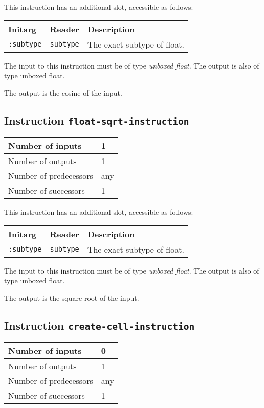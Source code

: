 This instruction has an additional slot, accessible as follows:

\begin{tabular}{|l|l|l|}
  \hline
  Initarg & Reader & Description\\
  \hline\hline
  \texttt{:subtype} & \texttt{subtype} & The exact subtype of float.\\
  \hline
\end{tabular}

The input to this instruction must be of type \emph{unboxed
  float}. The output is also of type unboxed float.

The output is the cosine of the input.

\subsection{Instruction \texttt{float-sqrt-instruction}}
\label{hir-instruction-float-div}

\begin{tabular}{|l|l|}
\hline
Number of inputs & 1\\
\hline
Number of outputs & 1\\
\hline
Number of predecessors & any\\
\hline
Number of successors & 1\\
\hline
\end{tabular}

This instruction has an additional slot, accessible as follows:

\begin{tabular}{|l|l|l|}
  \hline
  Initarg & Reader & Description\\
  \hline\hline
  \texttt{:subtype} & \texttt{subtype} & The exact subtype of float.\\
  \hline
\end{tabular}

The input to this instruction must be of type \emph{unboxed
  float}. The output is also of type unboxed float.

The output is the square root of the input.

\subsection{Instruction \texttt{create-cell-instruction}}
\label{hir-instruction-create-cell}

\begin{tabular}{|l|l|}
\hline
Number of inputs & 0\\
\hline
Number of outputs & 1\\
\hline
Number of predecessors & any\\
\hline
Number of successors & 1\\
\hline
\end{tabular}

